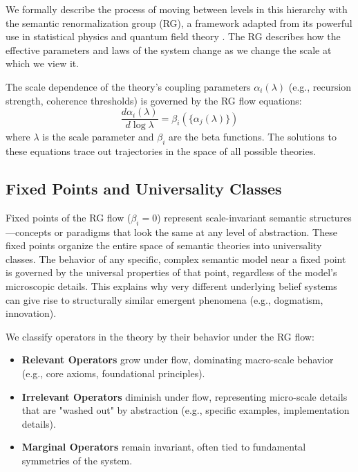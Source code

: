 We formally describe the process of moving between levels in this hierarchy with the semantic renormalization group (RG), a framework adapted from its powerful use in statistical physics and quantum field theory \autocite{Wilson1971, Cardy1996}. The RG describes how the effective parameters and laws of the system change as we change the scale at which we view it.

The scale dependence of the theory's coupling parameters \(\alpha_i(\lambda)\) (e.g., recursion strength, coherence thresholds) is governed by the RG flow equations:
\begin{equation}
\frac{d\alpha_i(\lambda)}{d\log\lambda} = \beta_i(\{\alpha_j(\lambda)\})
\end{equation}
where \(\lambda\) is the scale parameter and \(\beta_i\) are the beta functions. The solutions to these equations trace out trajectories in the space of all possible theories.


\subsection{Fixed Points and Universality Classes}
\label{sec:fixed_points_and_universality_classes}

Fixed points of the RG flow (\(\beta_i = 0\)) represent scale-invariant semantic structures—concepts or paradigms that look the same at any level of abstraction. These fixed points organize the entire space of semantic theories into universality classes. The behavior of any specific, complex semantic model near a fixed point is governed by the universal properties of that point, regardless of the model's microscopic details. This explains why very different underlying belief systems can give rise to structurally similar emergent phenomena (e.g., dogmatism, innovation).

We classify operators in the theory by their behavior under the RG flow:
\begin{itemize}
    \item \textbf{Relevant Operators} grow under flow, dominating macro-scale behavior (e.g., core axioms, foundational principles).
    \item \textbf{Irrelevant Operators} diminish under flow, representing micro-scale details that are "washed out" by abstraction (e.g., specific examples, implementation details).
    \item \textbf{Marginal Operators} remain invariant, often tied to fundamental symmetries of the system.
\end{itemize}

